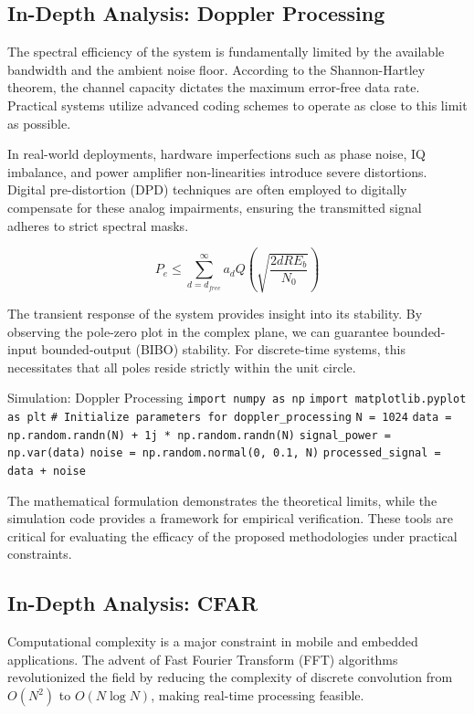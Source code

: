 \subsection{In-Depth Analysis: Doppler Processing}
The spectral efficiency of the system is fundamentally limited by the available bandwidth and the ambient noise floor. According to the Shannon-Hartley theorem, the channel capacity dictates the maximum error-free data rate. Practical systems utilize advanced coding schemes to operate as close to this limit as possible.

In real-world deployments, hardware imperfections such as phase noise, IQ imbalance, and power amplifier non-linearities introduce severe distortions. Digital pre-distortion (DPD) techniques are often employed to digitally compensate for these analog impairments, ensuring the transmitted signal adheres to strict spectral masks.

\begin{equation}
    P_e \leq \sum_{d=d_{free}}^{\infty} a_d Q\left(\sqrt{\frac{2 d R E_b}{N_0}}\right)
\end{equation}

The transient response of the system provides insight into its stability. By observing the pole-zero plot in the complex plane, we can guarantee bounded-input bounded-output (BIBO) stability. For discrete-time systems, this necessitates that all poles reside strictly within the unit circle.

\begin{pythonbox}{Simulation: Doppler Processing}
\texttt{import numpy as np}
\texttt{import matplotlib.pyplot as plt}
\texttt{}
\texttt{\# Initialize parameters for doppler\_processing}
\texttt{N = 1024}
\texttt{data = np.random.randn(N) + 1j * np.random.randn(N)}
\texttt{signal\_power = np.var(data)}
\texttt{noise = np.random.normal(0, 0.1, N)}
\texttt{processed\_signal = data + noise}
\end{pythonbox}

\vspace{0.5cm}
The mathematical formulation demonstrates the theoretical limits, while the simulation code provides a framework for empirical verification. These tools are critical for evaluating the efficacy of the proposed methodologies under practical constraints.


\subsection{In-Depth Analysis: CFAR}
Computational complexity is a major constraint in mobile and embedded applications. The advent of Fast Fourier Transform (FFT) algorithms revolutionized the field by reducing the complexity of discrete convolution from $O(N^2)$ to $O(N \log N)$, making real-time processing feasible.

